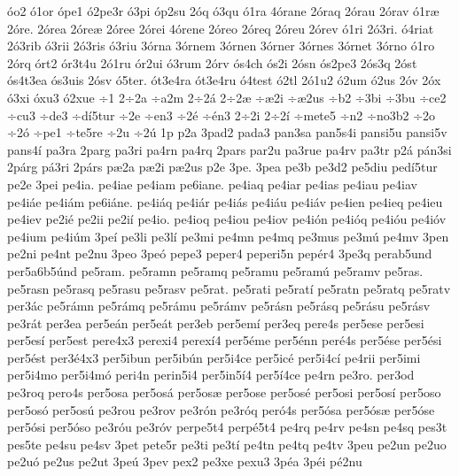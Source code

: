 {^^f3o2
^^f31or
^^f3pe1
^^f32pe3r
^^f33pi
^^f3p2su
2^^f3q
^^f33qu
^^f31ra
4^^f3rane
2^^f3raq
2^^f3rau
2^^f3rav
^^f31r^^e6
2^^f3re.
2^^f3rea
2^^f3re^^e6
2^^f3ree
2^^f3rei
4^^f3rene
2^^f3reo
2^^f3req
2^^f3reu
2^^f3rev
^^f31ri
2^^f33ri.
^^f34riat
2^^f33rib
^^f33rii
2^^f33ris
^^f33riu
3^^f3rna
3^^f3rnem
3^^f3rnen
3^^f3rner
3^^f3rnes
3^^f3rnet
3^^f3rno
^^f31ro
2^^f3rq
^^f3rt2
^^f3r3t4u
2^^f31ru
^^f3r2ui
^^f33rum
2^^f3rv
^^f3s4ch
^^f3s2i
2^^f3sn
^^f3s2pe3
2^^f3s3q
2^^f3st
^^f3s4t3ea
^^f3s3uis
2^^f3sv
^^f35ter.
^^f3t3e4ra
^^f3t3e4ru
^^f34test
^^f32tl
2^^f31u2
^^f32um
^^f32us
2^^f3v
2^^f3x
^^f33xi
^^f3xu3
^^f32xue
^^f71
2^^f72a
^^f7a2m
2^^f72^^e1
2^^f72^^e6
^^f7^^e62i
^^f7^^e62us
^^f7b2
^^f73bi
^^f73bu
^^f7ce2
^^f7cu3
^^f7de3
^^f7d^^ed5tur
^^f72e
^^f7en3
^^f72^^e9
^^f7^^e9n3
2^^f72i
2^^f72^^ed
^^f7mete5
^^f7n2
^^f7no3b2
^^f72o
^^f72^^f3
^^f7pe1
^^f7te5re
^^f72u
^^f72^^fa
1p
p2a
3pad2
pada3
pan3sa
pan5s4i
pansi5u
pansi5v
pans4^^ed
pa3ra
2parg
pa3ri
pa4rn
pa4rq
2pars
par2u
pa3rue
pa4rv
pa3tr
p2^^e1
p^^e1n3si
2p^^e1rg
p^^e13ri
2p^^e1rs
p^^e62a
p^^e62i
p^^e62us
p2e
3pe.
3pea
pe3b
pe3d2
pe5diu
ped^^ed5tur
pe2e
3pei
pe4ia.
pe4iae
pe4iam
pe6iane.
pe4iaq
pe4iar
pe4ias
pe4iau
pe4iav
pe4i^^e1e
pe4i^^e1m
pe6i^^e1ne.
pe4i^^e1q
pe4i^^e1r
pe4i^^e1s
pe4i^^e1u
pe4i^^e1v
pe4ien
pe4ieq
pe4ieu
pe4iev
pe2i^^e9
pe2ii
pe2i^^ed
pe4io.
pe4ioq
pe4iou
pe4iov
pe4i^^f3n
pe4i^^f3q
pe4i^^f3u
pe4i^^f3v
pe4ium
pe4i^^fam
3pe^^ed
pe3li
pe3l^^ed
pe3mi
pe4mn
pe4mq
pe3mus
pe3m^^fa
pe4mv
3pen
pe2ni
pe4nt
pe2nu
3peo
3pe^^f3
pepe3
peper4
peperi5n
pep^^e9r4
3pe3q
perab5und
per5a6b5^^fand
pe5ram.
pe5ramn
pe5ramq
pe5ramu
pe5ram^^fa
pe5ramv
pe5ras.
pe5rasn
pe5rasq
pe5rasu
pe5rasv
pe5rat.
pe5rati
pe5rat^^ed
pe5ratn
pe5ratq
pe5ratv
per3^^e1c
pe5r^^e1mn
pe5r^^e1mq
pe5r^^e1mu
pe5r^^e1mv
pe5r^^e1sn
pe5r^^e1sq
pe5r^^e1su
pe5r^^e1sv
pe3r^^e1t
per3ea
per5e^^e1n
per5e^^e1t
per3eb
per5em^^ed
per3eq
pere4s
per5ese
per5esi
per5es^^ed
per5est
pere4x3
perexi4
perex^^ed4
per5^^e9me
per5^^e9nn
per^^e94s
per5^^e9se
per5^^e9si
per5^^e9st
per3^^e94x3
per5ibun
per5ib^^fan
per5i4ce
per5ic^^e9
per5i4c^^ed
pe4rii
per5imi
per5i4mo
per5i4m^^f3
peri4n
perin5i4
per5in5^^ed4
per5^^ed4ce
pe4rn
pe3ro.
per3od
pe3roq
pero4s
per5osa
per5os^^e1
per5os^^e6
per5ose
per5os^^e9
per5osi
per5os^^ed
per5oso
per5os^^f3
per5os^^fa
pe3rou
pe3rov
pe3r^^f3n
pe3r^^f3q
per^^f34s
per5^^f3sa
per5^^f3s^^e6
per5^^f3se
per5^^f3si
per5^^f3so
pe3r^^f3u
pe3r^^f3v
perpe5t4
perp^^e95t4
pe4rq
pe4rv
pe4sn
pe4sq
pes3t
pes5te
pe4su
pe4sv
3pet
pete5r
pe3ti
pe3t^^ed
pe4tn
pe4tq
pe4tv
3peu
pe2un
pe2uo
pe2u^^f3
pe2us
pe2ut
3pe^^fa
3pev
pex2
pe3xe
pexu3
3p^^e9a
3p^^e9i
p^^e92nu
}
